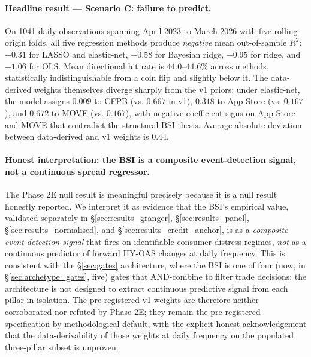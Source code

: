 \documentclass[11pt,a4paper]{article}
\begin{document}
\paragraph{Headline result --- Scenario C: failure to predict.} On 1041 daily observations spanning April 2023 to March 2026 with five rolling-origin folds, all five regression methods produce \emph{negative} mean out-of-sample $R^2$: $-0.31$ for LASSO and elastic-net, $-0.58$ for Bayesian ridge, $-0.95$ for ridge, and $-1.06$ for OLS. Mean directional hit rate is $44.0$--$44.6\%$ across methods, statistically indistinguishable from a coin flip and slightly below it. The data-derived weights themselves diverge sharply from the v1 priors: under elastic-net, the model assigns $0.009$ to CFPB (vs. $0.667$ in v1), $0.318$ to App Store (vs. $0.167$), and $0.672$ to MOVE (vs. $0.167$), with negative coefficient signs on App Store and MOVE that contradict the structural BSI thesis. Average absolute deviation between data-derived and v1 weights is $0.44$.

\paragraph{Honest interpretation: the BSI is a composite event-detection signal, not a continuous spread regressor.} The Phase 2E null result is meaningful precisely because it is a null result honestly reported. We interpret it as evidence that the BSI's empirical value, validated separately in §\ref{sec:results_granger}, §\ref{sec:results_panel}, §\ref{sec:results_normalised}, and §\ref{sec:results_credit_anchor}, is as a \emph{composite event-detection signal} that fires on identifiable consumer-distress regimes, \emph{not} as a continuous predictor of forward HY-OAS changes at daily frequency. This is consistent with the §\ref{sec:gates} architecture, where the BSI is one of four (now, in §\ref{sec:archetype_gates}, five) gates that AND-combine to filter trade decisions; the architecture is not designed to extract continuous predictive signal from each pillar in isolation. The pre-registered v1 weights are therefore neither corroborated nor refuted by Phase 2E; they remain the pre-registered specification by methodological default, with the explicit honest acknowledgement that the data-derivability of those weights at daily frequency on the populated three-pillar subset is unproven.
\end{document}
